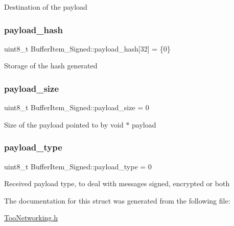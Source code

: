 Destination of the payload \mbox{\label{structBufferItem__Signed_aea55c4b9fa78da421de8f83df370fb57}} 
\subsubsection{\texorpdfstring{payload\+\_\+hash}{payload\_hash}}
{\footnotesize\ttfamily uint8\+\_\+t Buffer\+Item\+\_\+\+Signed\+::payload\+\_\+hash\mbox{[}32\mbox{]} = \{0\}}

Storage of the hash generated \mbox{\label{structBufferItem__Signed_a99af0ec40a5d44a11df8592667fe7614}} 
\subsubsection{\texorpdfstring{payload\+\_\+size}{payload\_size}}
{\footnotesize\ttfamily uint8\+\_\+t Buffer\+Item\+\_\+\+Signed\+::payload\+\_\+size = 0}

Size of the payload pointed to by void $\ast$ payload \mbox{\label{structBufferItem__Signed_a75a67331ae70b15b59ba8941313e4fce}} 
\subsubsection{\texorpdfstring{payload\+\_\+type}{payload\_type}}
{\footnotesize\ttfamily uint8\+\_\+t Buffer\+Item\+\_\+\+Signed\+::payload\+\_\+type = 0}

Received payload type, to deal with messages signed, encrypted or both 

The documentation for this struct was generated from the following file\+:\begin{DoxyCompactItemize}
\item 
\hyperlink{TooNetworking_8h}{Too\+Networking.\+h}\end{DoxyCompactItemize}
